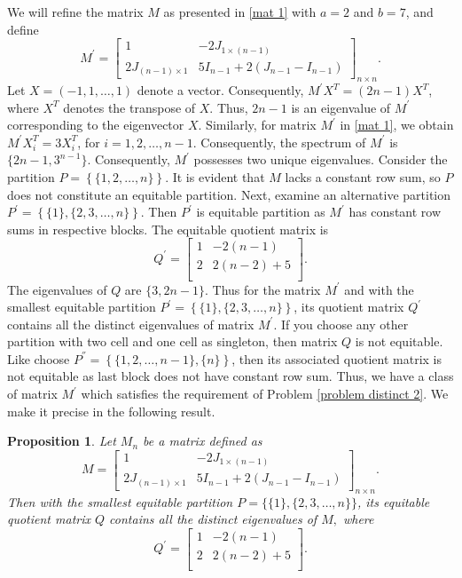 \documentclass[12pt,twoside]{article}
\newtheorem{proposition}[theorem]{Proposition}
\begin{document}
We will refine the matrix \( M \) as presented in \eqref{mat 1} with \( a=2 \) and \( b=7 \), and define $$ M^{\prime}=\begin{bmatrix} 1 & -2J_{1\times (n-1)}\\ 2 J_{(n-1)\times 1} & 5I_{n-1}+2(J_{n-1}-I_{n-1}) \end{bmatrix}_{n\times n}. $$
Let \( X = (-1, 1, \ldots, 1) \) denote a vector. Consequently, $M^{\prime}X^{T}=(2n-1)X^{T}$, where $X^{T}$ denotes the transpose of $X$. Thus, $2n-1$ is an eigenvalue of $M^{\prime}$ corresponding to the eigenvector $X$. Similarly, for matrix $M^{\prime}$ in \eqref{mat 1}, we obtain $M^{\prime}X_{i}^{T}=3X_{i}^{T}$, for $i=1,2,\dots,n-1$. Consequently, the spectrum of $M^{\prime}$ is $\{2n-1,3^{n-1}\}$. Consequently, $M^{\prime}$ possesses two unique eigenvalues. Consider the partition \( P=\left \{\{1,2,\dots,n\}\right \} \). It is evident that \( M \) lacks a constant row sum, so \( P \) does not constitute an equitable partition. Next, examine an alternative partition $P^{\prime}=\left \{\{1\},\{2,3,\dots,n\}\right \}$. Then $P^{\prime}$ is equitable partition as $M^{\prime}$ has constant row sums in respective blocks. The equitable quotient matrix is 
$$ Q^{\prime}=\left[
\begin{array}{cc}
	1 & -2 (n-1) \\
	2 & 2 (n-2)+5 \\
\end{array}
\right].$$
The eigenvalues of $Q$ are $\{3,2n-1\}.$ Thus for the matrix $M^{\prime}$ and with the smallest equitable partition $P^{\prime}=\left \{\{1\},\{2,3,\dots,n\}\right \}$, its quotient matrix $Q^{\prime}$  contains all the distinct eigenvalues of matrix $M^{\prime}$. If you choose any other partition with two cell and one cell as singleton, then matrix $Q$ is not equitable. Like choose $P^{''}=\left \{\{1,2,\dots,n-1\},\{n\}\right \}$, then its associated quotient matrix is not equitable as last block does not have constant row sum. Thus, we have a class of matrix $M^{\prime}$ which satisfies the requirement of Problem \ref{problem distinct 2}. We make it precise in the following result.
\begin{proposition}
	Let $M_{n}$ be a matrix defined as
	$$ M=\begin{bmatrix}
		1 & -2J_{1\times (n-1)}\\
		2 J_{(n-1)\times 1} & 5I_{n-1}+2(J_{n-1}-I_{n-1})
	\end{bmatrix}_{n\times n}. $$
	Then  with the smallest equitable partition $P=\{\{1\},\{2,3,\dots,n\}\}$, its equitable quotient matrix $Q$ contains all the distinct eigenvalues of $M,$ where
	$$ Q^{\prime}=\left[
	\begin{array}{cc}
		1 & -2 (n-1) \\
		2 & 2 (n-2)+5 \\
	\end{array}
	\right].$$
\end{proposition}
\end{document}

